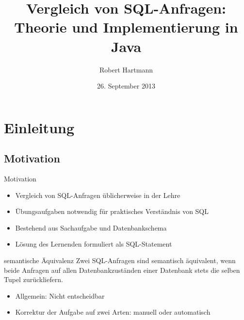 \documentclass{beamer}
\title[Vergleich von SQL-Anfragen]{Vergleich von SQL-Anfragen:\\Theorie und Implementierung in Java}
\author[Robert Hartmann]{Robert Hartmann}
\institute[] %
{
  Martin-Luther-Universität Halle-Wittenberg\\
  Naturwissenschaftliche Fakultät III\\
  Institut für Informatik
}
\date[]{26. September 2013}
\begin{document}
\begin{frame}
  \titlepage
\end{frame}

\begin{frame}{}
  \tableofcontents
\end{frame}

\section{Einleitung}
\subsection{Motivation}

\begin{frame}{Motivation}
\begin{itemize}
\item Vergleich von SQL-Anfragen üblicherweise in der Lehre
\item Übungsaufgaben notwendig für praktisches Verständnis von SQL
\item Bestehend aus Sachaufgabe und Datenbankschema
\item Lösung des Lernenden formuliert als SQL-Statement
\end{itemize}
\pause
\begin{alertblock}{semantische Äquivalenz}
Zwei SQL-Anfragen sind semantisch äquivalent, wenn beide Anfragen auf allen Datenbankzuständen einer Datenbank stets die selben Tupel zurückliefern.
\end{alertblock}

\begin{itemize}
\item Allgemein: Nicht entscheidbar
\item Korrektur der Aufgabe auf zwei Arten: manuell oder automatisch
\end{itemize}

\end{frame}
\end{document}
